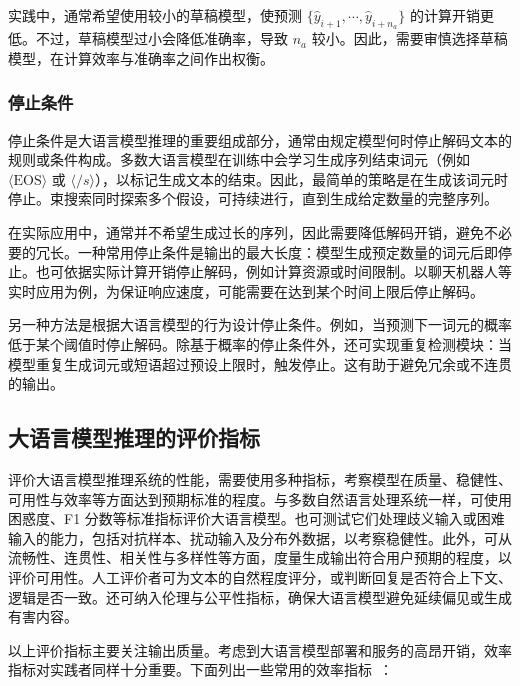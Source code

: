 实践中，通常希望使用较小的草稿模型，使预测 $\{\hat{y}_{i+1},\cdots,\hat{y}_{i+n_a}\}$ 的计算开销更低。不过，草稿模型过小会降低准确率，导致 $n_a$ 较小。因此，需要审慎选择草稿模型，在计算效率与准确率之间作出权衡。

\subsubsection{停止条件}

停止条件是大语言模型推理的重要组成部分，通常由规定模型何时停止解码文本的规则或条件构成。多数大语言模型在训练中会学习生成序列结束词元（例如 $\langle \mathrm{EOS} \rangle$ 或 $\langle /s \rangle$），以标记生成文本的结束。因此，最简单的策略是在生成该词元时停止。束搜索同时探索多个假设，可持续进行，直到生成给定数量的完整序列。

在实际应用中，通常并不希望生成过长的序列，因此需要降低解码开销，避免不必要的冗长。一种常用停止条件是输出的最大长度：模型生成预定数量的词元后即停止。也可依据实际计算开销停止解码，例如计算资源或时间限制。以聊天机器人等实时应用为例，为保证响应速度，可能需要在达到某个时间上限后停止解码。

另一种方法是根据大语言模型的行为设计停止条件。例如，当预测下一词元的概率低于某个阈值时停止解码。除基于概率的停止条件外，还可实现重复检测模块：当模型重复生成词元或短语超过预设上限时，触发停止。这有助于避免冗余或不连贯的输出。

\subsection{大语言模型推理的评价指标}

评价大语言模型推理系统的性能，需要使用多种指标，考察模型在质量、稳健性、可用性与效率等方面达到预期标准的程度。与多数自然语言处理系统一样，可使用困惑度、F1 分数等标准指标评价大语言模型。也可测试它们处理歧义输入或困难输入的能力，包括对抗样本、扰动输入及分布外数据，以考察稳健性。此外，可从流畅性、连贯性、相关性与多样性等方面，度量生成输出符合用户预期的程度，以评价可用性。人工评价者可为文本的自然程度评分，或判断回复是否符合上下文、逻辑是否一致。还可纳入伦理与公平性指标，确保大语言模型避免延续偏见或生成有害内容。

以上评价指标主要关注输出质量。考虑到大语言模型部署和服务的高昂开销，效率指标对实践者同样十分重要。下面列出一些常用的效率指标~\cite{nvidia-nim-llm-benchmarking}：

